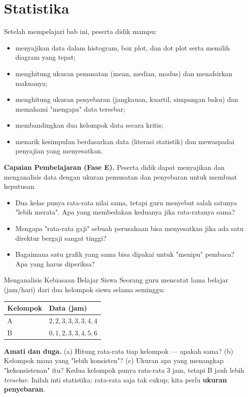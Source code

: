 \documentclass[11pt,a4paper]{report}
\theoremstyle{gaya}
\begin{document}
\chapter{Statistika}
\begin{tujuan}
Setelah mempelajari bab ini, peserta didik mampu:
\begin{itemize}[leftmargin=*,topsep=2pt]
  \item menyajikan data dalam histogram, box plot, dan dot plot serta memilih diagram yang tepat;
  \item menghitung ukuran pemusatan (mean, median, modus) dan menafsirkan maknanya;
  \item menghitung ukuran penyebaran (jangkauan, kuartil, simpangan baku) dan memahami "mengapa" data tersebar;
  \item membandingkan dua kelompok data secara kritis;
  \item menarik kesimpulan berdasarkan data (literasi statistik) dan mewaspadai penyajian yang menyesatkan.
\end{itemize}
\textbf{Capaian Pembelajaran (Fase E).} Peserta didik dapat menyajikan dan menganalisis data dengan ukuran pemusatan dan penyebaran untuk membuat keputusan.
\end{tujuan}

\begin{pemantik}
\begin{itemize}[leftmargin=*,topsep=2pt]
  \item Dua kelas punya rata-rata nilai sama, tetapi guru menyebut salah satunya "lebih merata". Apa yang membedakan keduanya jika rata-ratanya sama?
  \item Mengapa "rata-rata gaji" sebuah perusahaan bisa menyesatkan jika ada satu direktur bergaji sangat tinggi?
  \item Bagaimana satu grafik yang sama bisa dipakai untuk "menipu" pembaca? Apa yang harus diperiksa?
\end{itemize}
\end{pemantik}

\begin{studikasus}{Menganalisis Kebiasaan Belajar Siswa}
Seorang guru mencatat lama belajar (jam/hari) dari dua kelompok siswa selama seminggu:
\begin{center}
\begin{tabular}{l|l}
\toprule
Kelompok & Data (jam) \\
\midrule
A & $2,2,3,3,3,3,4,4$ \\
B & $0,1,2,3,3,4,5,6$ \\
\bottomrule
\end{tabular}
\end{center}
\textbf{Amati dan duga.} (a) Hitung rata-rata tiap kelompok --- apakah sama? (b) Kelompok mana yang "lebih konsisten"? (c) Ukuran apa yang menangkap "kekonsistenan" itu? Kedua kelompok punya rata-rata $3$ jam, tetapi B jauh lebih \emph{tersebar}. Inilah inti statistika: rata-rata saja tak cukup; kita perlu \textbf{ukuran penyebaran}.
\end{studikasus}
\end{document}
